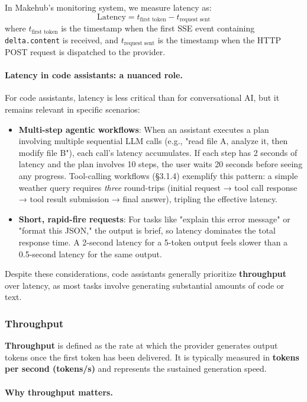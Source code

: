 \documentclass[english]{article}
\begin{document}
In Makehub's monitoring system, we measure latency as:
\[
\text{Latency} = t_{\text{first token}} - t_{\text{request sent}}
\]
where $t_{\text{first token}}$ is the timestamp when the first SSE event containing \texttt{delta.content} is received, and $t_{\text{request sent}}$ is the timestamp when the HTTP POST request is dispatched to the provider.

\paragraph{Latency in code assistants: a nuanced role.}

For code assistants, latency is less critical than for conversational AI, but it remains relevant in specific scenarios:
\begin{itemize}
    \item \textbf{Multi-step agentic workflows}: When an assistant executes a plan involving multiple sequential LLM calls (e.g., "read file A, analyze it, then modify file B"), each call's latency accumulates. If each step has 2 seconds of latency and the plan involves 10 steps, the user waits 20 seconds before seeing any progress. Tool-calling workflows (§3.1.4) exemplify this pattern: a simple weather query requires \emph{three} round-trips (initial request → tool call response → tool result submission → final answer), tripling the effective latency.
    \item \textbf{Short, rapid-fire requests}: For tasks like "explain this error message" or "format this JSON," the output is brief, so latency dominates the total response time. A 2-second latency for a 5-token output feels slower than a 0.5-second latency for the same output.
\end{itemize}

Despite these considerations, code assistants generally prioritize \textbf{throughput} over latency, as most tasks involve generating substantial amounts of code or text.


\subsubsection{Throughput}

\textbf{Throughput} is defined as the rate at which the provider generates output tokens once the first token has been delivered. It is typically measured in \textbf{tokens per second (tokens/s)} and represents the sustained generation speed.

\paragraph{Why throughput matters.}
\end{document}
